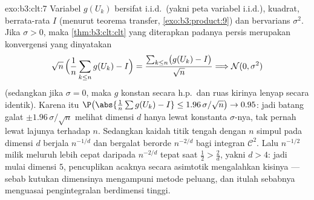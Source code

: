 \begin{solution}{exo:b3:clt:7}
Variabel $g(U_k)$ bersifat i.i.d.\ (yakni peta 
variabel i.i.d.),  kuadrat, berrata-rata $I$
(menurut teorema transfer, \cref{exo:b3:product:9}) dan bervarians
$\sigma^2$. Jika $\sigma > 0$, maka \cref{thm:b3:clt:clt} yang diterapkan
padanya persis merupakan konvergensi yang dinyatakan
\[
\sqrt n\,\Bigl(\frac1n\sum_{k\leq n}g(U_k) - I\Bigr) =
\frac{\sum_{k\leq n}\bigl(g(U_k) - I\bigr)}{\sqrt n}
\Longrightarrow \mathcal N(0, \sigma^2)
\]
(sedangkan jika $\sigma = 0$, maka $g$ konstan secara h.p.\ dan ruas
kirinya lenyap secara identik). Karena itu
$\P\bigl(\abs{\frac1n\sum g(U_k) - I} \leq
1.96\,\sigma/\sqrt n\bigr) \to 0.95$: jadi batang galat $\pm
1.96\,\sigma/\sqrt n$ melihat dimensi $d$ hanya lewat
konstanta $\sigma$-nya, tak pernah lewat lajunya terhadap $n$. Sedangkan
kaidah titik tengah dengan $n$ simpul pada dimensi $d$ berjala
$n^{-1/d}$ dan bergalat berorde $n^{-2/d}$ bagi integran
$\mathcal C^2$. Lalu $n^{-1/2}$ milik  meluruh lebih cepat daripada
$n^{-2/d}$ tepat saat $\frac12 > \frac2d$, yakni $d > 4$:
jadi mulai dimensi $5$, pencuplikan acaknya secara asimtotik mengalahkan
kisinya --- sebab kutukan dimensinya mengampuni metode
peluang, dan itulah sebabnya  menguasai
pengintegralan berdimensi tinggi.
\end{solution}

